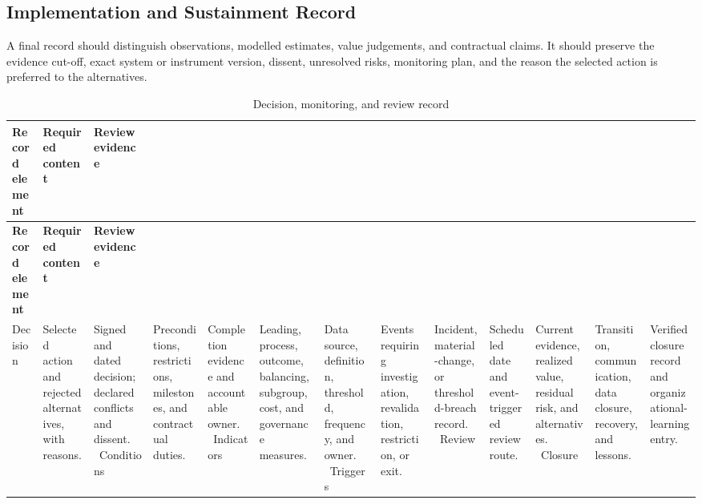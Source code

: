 \subsection{Implementation and Sustainment Record}
\label{sec:comp-ch04-supp-3}
A final record should distinguish observations, modelled estimates, value
judgements, and contractual claims. It should preserve the evidence cut-off, exact
system or instrument version, dissent, unresolved risks, monitoring plan, and the
reason the selected action is preferred to the alternatives.

\begin{longtable}{@{}p{}p{}p{}@{}}
\caption{Decision, monitoring, and review record}
\label{tab:comp-ch04-decision-record}\\
\toprule
\textbf{Record element} & \textbf{Required content} & \textbf{Review evidence} \\
\midrule
\endfirsthead
\toprule
\textbf{Record element} & \textbf{Required content} & \textbf{Review evidence} \\
\midrule
\endhead
\bottomrule
\endlastfoot
Decision & Selected action and rejected alternatives, with reasons. & Signed and dated decision; declared conflicts and dissent. \
Conditions & Preconditions, restrictions, milestones, and contractual duties. & Completion evidence and accountable owner. \
Indicators & Leading, process, outcome, balancing, subgroup, cost, and governance measures. & Data source, definition, threshold, frequency, and owner. \
Triggers & Events requiring investigation, revalidation, restriction, or exit. & Incident, material-change, or threshold-breach record. \
Review & Scheduled date and event-triggered review route. & Current evidence, realized value, residual risk, and alternatives. \
Closure & Transition, communication, data closure, recovery, and lessons. & Verified closure record and organizational-learning entry. \
\end{longtable}
